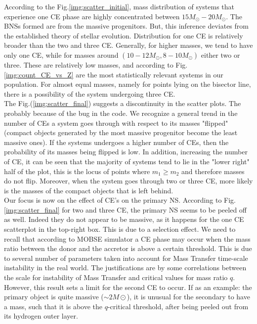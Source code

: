 \documentclass[preprint,12pt]{elsarticle}
\begin{document}
According to the Fig.\ref{img:scatter_initial}, mass distribution of systems that experience one CE phase are highly concentrated between $15 M_\odot-20 M_\odot$. The BNSs formed are from the massive progenitors. But, this inference deviates from the established theory of stellar evolution. Distribution for one CE is relatively broader than the two and three CE. Generally, for higher masses, we tend to have only one CE, while for masses around $(10-12 M_\odot, 8-10 M_\odot)$ either two or three. These are relatively low masses, and according to Fig.\ref{img:count_CE_vs_Z} are the most statistically relevant systems in our population\citep{Kroupa:2001, Salpeter:1955}. For almost equal masses, namely for points lying on the bisector line, there is a possibility of the system undergoing three CE.\\

The Fig.(\ref{img:scatter_final}) suggests a discontinuity in the scatter plots. The probably because of the bug in the code. We recognize a general trend in the number of CEs a system goes through with respect to its masses "flipped" (compact objects generated by the most massive progenitor become the least massive ones). If the systems undergoes a higher number of CEs, then the probability of its masses being flipped is low. In addition, increasing the number of CE, it can be seen that the majority of systems tend to lie in the "lower right" half of the plot, this is the locus of points where $m_1 \geqslant m_2$ and therefore masses do not flip. Moreover, when the system goes through two or three CE, more likely is the masses of the compact objects that is left behind.\\

Our focus is now on the effect of CE's on the primary NS. According to Fig.\ref{img:scatter_final} for two and three CE, the primary NS seems to be peeled off as well. Indeed they do not appear to be massive, as it happens for the one CE scatterplot in the top-right box. This is due to a selection effect. We need to recall that according to MOBSE simulator a CE phase may occur when the mass ratio between the donor and the accretor is above a certain threshold. This is due to several number of parameters taken into account for Mass Transfer time-scale instability in the real world. The justifications are by some correlations between the scale for instability of Mass Transfer and critical values for mass ratio $q$. However, this result sets a limit for the second CE to occur. If as an example: the primary object is quite massive ($\sim 2 M\odot$), it is unusual for the secondary to have a mass, such that it is above the $q$-critical threshold, after being peeled out from its hydrogen outer layer.\\
\end{document}
